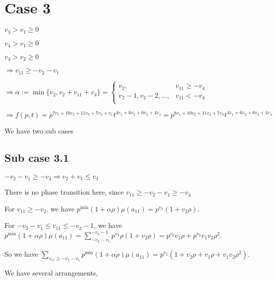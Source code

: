 \documentclass{article}
\begin{document}
\section{Case 3}
$v_3>v_1\geq{0}$

$v_4>v_1\geq{0}$

$v_4>v_2\geq{0}$

$\Rightarrow{v_{11}}\geq{-v_2-v_1}$

$\Rightarrow\alpha:=\min\{v_2,v_2+v_{11}+v_4\}=\begin{cases}
       v_2, & v_{11}\geq{-v_4}\\
       v_2-1,v_2-2,\dots, & v_{11}<{-v_4}\\
     \end{cases}$

     $\Rightarrow{f(p,t)=p^{7v_1+10v_2+11v_3+7v_4+v_1}t^{4v_1+6v_2+6v_3+4v_4}=p^{8v_1+10v_2+11v_3+7v_4}t^{4v_1+6v_2+6v_3+4v_4}}$

We have two sub cases

\subsection{Sub case 3.1}
$-v_2-v_1\geq{-v_4}\Rightarrow{v_2+v_1\leq{v_4}}$

There is no phase transition here, since $v_{11}\geq{-v_2-v_1}\geq{-v_4}$

For $v_{11}\geq{-v_2}$, we have $p^{\min}(1+\alpha\rho)\mu(a_{11})=p^{v_2}(1+v_2\rho)$.

For $-v_2-v_1\leq{v_{11}}\leq{-v_2-1}$, we have $p^{\min}(1+\alpha\rho)\mu(a_{11})=\sum_{-v_2-v_1}^{-v_2-1}p^{v_2}\rho(1+v_2\rho)=p^{v_2}v_1\rho+p^{v_2}v_1v_2\rho^2$.

So we have $\sum_{v_{11}\geq{-v_2-v_1}}p^{\min}(1+\alpha\rho)\mu(a_{11})=p^{v_2}(1+v_2\rho+v_1\rho+v_1v_2\rho^2).$

We have several arrangements,
\end{document}
